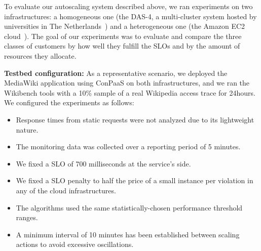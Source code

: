 To evaluate our autoscaling system described above, we ran experiments
on two infrastructures: a homogeneous one (the DAS-4, a multi-cluster system
hosted by universities in The Netherlands~\cite{das4}) and a heterogeneous
one (the Amazon EC2 cloud~\cite{amazonEC2}). The goal of our experiments
was to evaluate and compare the three classes of customers by how well they fulfill 
the SLOs and by the amount of resources they allocate.



\textbf{Testbed configuration:}  As a representative scenario, we deployed the MediaWiki application using ConPaaS on both infrastructures, and we ran the Wikibench tools with a 10\% sample of a real Wikipedia access trace for 24hours. 
We configured the experiments as follows:

\begin{itemize}
\item  Response times from static requests were not analyzed due to its lightweight nature. 

\item The monitoring data was collected over a reporting period of 5 minutes.

\item We fixed a SLO of 700 milliseconds at the service's side.

\item We fixed a SLO penalty to half the price of a small instance per violation in any of the cloud infrastructures.

\item The algorithms used the same statistically-chosen performance threshold ranges. 

\item A minimum interval of 10 minutes has been established between scaling actions to avoid excessive oscillations. 
\end{itemize}


